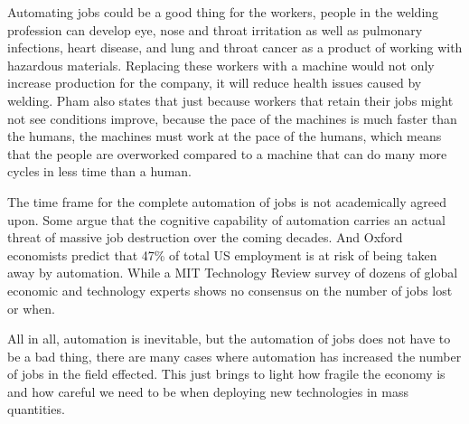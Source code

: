 \documentclass[12pt]{article}
\begin{document}
	Automating jobs could be a good thing for the workers, people in the welding profession
	can develop eye, nose and throat irritation as well as pulmonary infections, heart
	disease, and lung and throat cancer as a product of working with hazardous materials.
	\autocite{pham} Replacing these workers with a machine would not only increase production
	for the company, it will reduce health issues caused by welding. Pham also states that
	just because workers that retain their jobs might not see conditions improve, because
	the pace of the machines is much faster than the humans, the machines must work at
	the pace of the humans, which means that the people are overworked compared to a
	machine that can do many more cycles in less time than a human.

	The time frame for the complete automation of jobs is not academically agreed upon.
	Some \autocite{ford} argue that the cognitive capability of automation carries an
	actual threat of massive job destruction over the coming decades. And \autocite{frey}
	Oxford economists predict that 47\% of total US employment is at risk of being taken
	away by automation. While a MIT Technology Review survey of dozens of global economic
	and technology experts shows no consensus on the number of jobs lost or when.
	\autocite{winick}

	All in all, automation is inevitable, but the automation of jobs does not have to be
	a bad thing, there are many cases where automation has increased the number of jobs
	in the field effected. This just brings to light how fragile the economy is and how
	careful we need to be when deploying new technologies in mass quantities.

	\newpage
	\printbibliography
\end{document}
